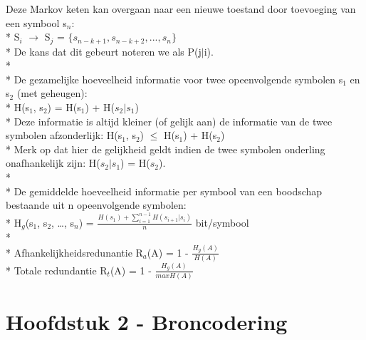 \documentclass[10pt]{article}
\begin{document}
Deze Markov keten kan overgaan naar een nieuwe toestand door toevoeging van een symbool s$_n$:\\*
S$_i$ $\rightarrow$ S$_j$ = $\{s_{n-k+1}, s_{n-k+2}, ..., s_n\}$\\*
De kans dat dit gebeurt noteren we als P(j$|$i).\\*\\*
De gezamelijke hoeveelheid informatie voor twee opeenvolgende symbolen s$_1$ en s$_2$ (met geheugen):\\*
H(s$_1$, s$_2$) = H(s$_1$) + H($s_2|s_1$)\\*
Deze informatie is altijd kleiner (of gelijk aan) de informatie van de twee symbolen afzonderlijk: H(s$_1$, s$_2$) $\le$ H(s$_1$) + H(s$_2$)\\*
{\scriptsize Merk op dat hier de gelijkheid geldt indien de twee symbolen onderling onafhankelijk zijn: H($s_2|s_1$) = H($s_2$).}\\*\\*
De gemiddelde hoeveelheid informatie per symbool van een boodschap bestaande uit n opeenvolgende symbolen:\\*
H$_g$(s$_1$, s$_2$, \dots, s$_n$) = $\frac{H(s_1) + \sum_{i = 1}^{n-1} H(s_{i+1}|s_i)}{n}$ bit/symbool\\*\\*
Afhankelijkheidsredunantie R$_a$(A) = 1 - $\frac{H_g(A)}{H(A)}$\\*
Totale redundantie R$_t$(A) = 1 - $\frac{H_g(A)}{maxH(A)}$
\section{Hoofdstuk 2 - Broncodering}
\end{document}
